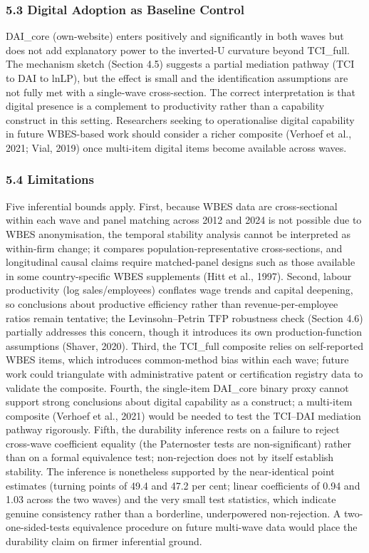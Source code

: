 \documentclass[
  12pt,a4paper]{article}
\begin{document}
\hypertarget{digital-adoption-as-baseline-control}{%
\subsubsection{5.3 Digital Adoption as Baseline
Control}\label{digital-adoption-as-baseline-control}}

DAI\_core (own-website) enters positively and significantly in both
waves but does not add explanatory power to the inverted-U curvature
beyond TCI\_full. The mechanism sketch (Section 4.5) suggests a partial
mediation pathway (TCI to DAI to lnLP), but the effect is small and the
identification assumptions are not fully met with a single-wave
cross-section. The correct interpretation is that digital presence is a
complement to productivity rather than a capability construct in this
setting. Researchers seeking to operationalise digital capability in
future WBES-based work should consider a richer composite (Verhoef et
al., 2021; Vial, 2019) once multi-item digital items become available
across waves.

\hypertarget{limitations}{%
\subsubsection{5.4 Limitations}\label{limitations}}

Five inferential bounds apply. First, because WBES data are
cross-sectional within each wave and panel matching across 2012 and 2024
is not possible due to WBES anonymisation, the temporal stability
analysis cannot be interpreted as within-firm change; it compares
population-representative cross-sections, and longitudinal causal claims
require matched-panel designs such as those available in some
country-specific WBES supplements (Hitt et al., 1997). Second, labour
productivity (log sales/employees) conflates wage trends and capital
deepening, so conclusions about productive efficiency rather than
revenue-per-employee ratios remain tentative; the Levinsohn--Petrin TFP
robustness check (Section 4.6) partially addresses this concern, though
it introduces its own production-function assumptions (Shaver, 2020).
Third, the TCI\_full composite relies on self-reported WBES items, which
introduces common-method bias within each wave; future work could
triangulate with administrative patent or certification registry data to
validate the composite. Fourth, the single-item DAI\_core binary proxy
cannot support strong conclusions about digital capability as a
construct; a multi-item composite (Verhoef et al., 2021) would be needed
to test the TCI--DAI mediation pathway rigorously. Fifth, the durability
inference rests on a failure to reject cross-wave coefficient equality
(the Paternoster tests are non-significant) rather than on a formal
equivalence test; non-rejection does not by itself establish stability.
The inference is nonetheless supported by the near-identical point
estimates (turning points of 49.4 and 47.2 per cent; linear coefficients
of 0.94 and 1.03 across the two waves) and the very small test
statistics, which indicate genuine consistency rather than a borderline,
underpowered non-rejection. A two-one-sided-tests equivalence procedure
on future multi-wave data would place the durability claim on firmer
inferential ground.
\end{document}
